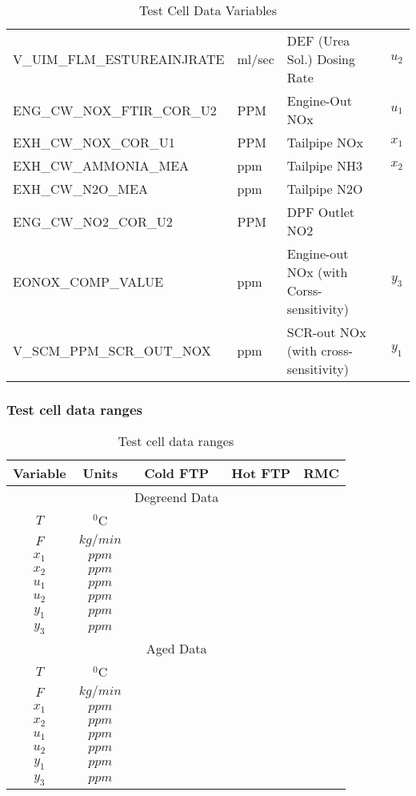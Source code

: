 \begin{table}[H]
\begin{tabular}{l l l c}
   V\_UIM\_FLM\_ESTUREAINJRATE	 & ml/sec & DEF (Urea Sol.) Dosing Rate
                                          & $u_2$\\
   ENG\_CW\_NOX\_FTIR\_COR\_U2	 & PPM    & Engine-Out NOx
                                          & $u_1$\\
   EXH\_CW\_NOX\_COR\_U1	     & PPM    & Tailpipe NOx
                                          & $x_1$\\
   EXH\_CW\_AMMONIA\_MEA	     & ppm    & Tailpipe NH3
                                          & $x_2$\\
   EXH\_CW\_N2O\_MEA	         & ppm    & Tailpipe N2O
                                          &\\
   ENG\_CW\_NO2\_COR\_U2	     & PPM    & DPF Outlet NO2
                                          &\\
EONOX\_COMP\_VALUE	         & ppm    & Engine-out NOx (with Corss-sensitivity)
                                      & $y_3$\\
V\_SCM\_PPM\_SCR\_OUT\_NOX	 & ppm    & SCR-out NOx  (with cross-sensitivity)                    & $y_1$\\
   \hline \hline
\end{tabular}
\caption{Test Cell Data Variables}
\end{table}

\subsubsection{Test cell data ranges}
\begin{table}[H]
\centering
\begin{tabular}{c c c c c}
\hline \hline
Variable & Units &Cold FTP & Hot FTP & RMC\\
\hline \hline
& & Degreend Data & & \\ \hline
$T$   & $^0$C & & &
\\
$F$   & $kg/min$ & & &
\\
$x_1$ & $ppm$ & & &
\\
$x_2$ & $ppm$ & & &
\\
$u_1$ & $ppm$ & & &
\\
$u_2$ & $ppm$ & & &
\\
$y_1$ & $ppm$ & & &
\\
$y_3$ & $ppm$ & & &
\\
\hline
& & Aged Data & & \\ \hline
$T$   & $^0$C & & &
\\
$F$   & $kg/min$ & & &
\\
$x_1$ & $ppm$ & & &
\\
$x_2$ & $ppm$ & & &
\\
$u_1$ & $ppm$ & & &
\\
$u_2$ & $ppm$ & & &
\\
$y_1$ & $ppm$ & & &
\\
$y_3$ & $ppm$ & & &
\\
\hline \hline
\end{tabular}
\caption{Test cell data ranges}
\end{table}


